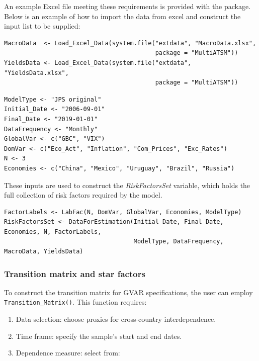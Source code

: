 An example Excel file meeting these requirements is provided with the package. Below is an example of how to import the data from excel and construct the input list to be supplied:

\begin{verbatim}
MacroData  <- Load_Excel_Data(system.file("extdata", "MacroData.xlsx",
                                          package = "MultiATSM"))
YieldsData <- Load_Excel_Data(system.file("extdata", "YieldsData.xlsx",
                                          package = "MultiATSM"))
\end{verbatim}

\begin{verbatim}
ModelType <- "JPS original"
Initial_Date <- "2006-09-01"
Final_Date <- "2019-01-01"
DataFrequency <- "Monthly"
GlobalVar <- c("GBC", "VIX")
DomVar <- c("Eco_Act", "Inflation", "Com_Prices", "Exc_Rates")
N <- 3
Economies <- c("China", "Mexico", "Uruguay", "Brazil", "Russia")
\end{verbatim}

These inputs are used to construct the \emph{RiskFactorsSet} variable, which holds the full collection of risk factors required by the model.

\begin{verbatim}
FactorLabels <- LabFac(N, DomVar, GlobalVar, Economies, ModelType)
RiskFactorsSet <- DataForEstimation(Initial_Date, Final_Date, Economies, N, FactorLabels,
                                    ModelType, DataFrequency, MacroData, YieldsData)
\end{verbatim}

\subsubsection{Transition matrix and star factors}\label{transition-matrix-and-star-factors}

To construct the transition matrix for GVAR specifications, the user can employ \texttt{Transition\_Matrix()}. This function requires:

\begin{enumerate}
\def\labelenumi{\arabic{enumi}.}
\item
  Data selection: choose proxies for cross-country interdependence.
\item
  Time frame: specify the sample's start and end dates.
\item
  Dependence measure: select from:
\end{enumerate}

